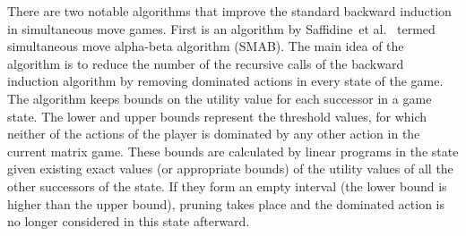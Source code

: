 There are two notable algorithms that improve the standard backward induction in simultaneous move games. 
First is an algorithm by Saffidine~et al.~\cite{Saffidine12SMAB} termed simultaneous move alpha-beta algorithm (SMAB). 
The main idea of the algorithm is to reduce the number of the recursive calls of the backward induction
algorithm by removing dominated actions in every state of the game. The algorithm keeps bounds on the utility value for each successor in a game state. 
The lower and upper bounds represent the threshold values, for which neither of the actions of the player is dominated by any other action in the current matrix game. These bounds are calculated by linear programs in the state given existing exact values (or appropriate bounds) of the utility values of all the other successors of the state. If they form an empty interval (the lower bound is higher than the upper bound), pruning takes place and the dominated action is no longer considered in this state afterward. 



